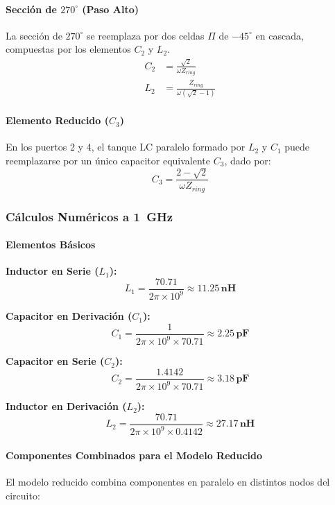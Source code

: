 \paragraph{Sección de $270^\circ$ (Paso Alto)}
La sección de $270^\circ$ se reemplaza por dos celdas $\Pi$ de $-45^\circ$ en cascada,
compuestas por los elementos $C_2$ y $L_2$.
\begin{align}
    C_2 &= \frac{\sqrt{2}}{\omega Z_{ring}} \\
    L_2 &= \frac{Z_{ring}}{\omega (\sqrt{2}-1)}
\end{align}

\paragraph{Elemento Reducido ($C_3$)}
En los puertos 2 y 4, el tanque LC paralelo formado por $L_2$ y $C_1$ puede reemplazarse por
un único capacitor equivalente $C_3$, dado por:
\begin{equation}
    C_3 = \frac{2 - \sqrt{2}}{\omega Z_{ring}}
\end{equation}

\subsubsection{Cálculos Numéricos a \SI{1}{\giga\hertz}}

\paragraph{Elementos Básicos}\mbox{}

\textbf{Inductor en Serie ($L_1$):}
\[
    L_1 = \frac{70.71}{2\pi \times 10^9} \approx \mathbf{11.25\,\text{nH}}
\]

\textbf{Capacitor en Derivación ($C_1$):}
\[
    C_1 = \frac{1}{2\pi \times 10^9 \times 70.71} \approx \mathbf{2.25\,\text{pF}}
\]

\textbf{Capacitor en Serie ($C_2$):}
\[
    C_2 = \frac{1.4142}{2\pi \times 10^9 \times 70.71} \approx \mathbf{3.18\,\text{pF}}
\]

\textbf{Inductor en Derivación ($L_2$):}
\[
    L_2 = \frac{70.71}{2\pi \times 10^9 \times 0.4142} \approx \mathbf{27.17\,\text{nH}}
\]

\paragraph{Componentes Combinados para el Modelo Reducido}

El modelo reducido combina componentes en paralelo en distintos nodos del circuito:

